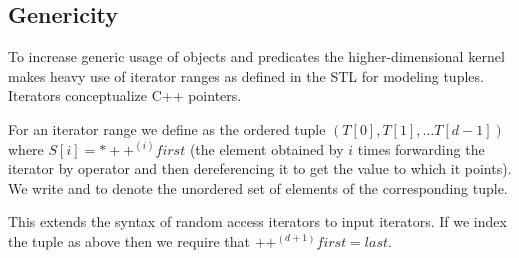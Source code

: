\subsection{Genericity}

To increase generic usage of objects and predicates the
higher-dimensional kernel makes heavy use of iterator ranges as
defined in the STL for modeling tuples. Iterators conceptualize C++
pointers. 

For an iterator range \ccc{[first,last)} we define \ccc{T = tuple
  [first,last)} as the ordered tuple $(T[0],T[1], \ldots T[d-1])$
where $S[i] = *++^{(i)}\mathit{first}$ (the element obtained by $i$
times forwarding the iterator by operator \ccc{++} and then
dereferencing it to get the value to which it points).  We write \ccc{d
  = size [first,last)} and \ccc{S = set [first,last)} to denote the
unordered set of elements of the corresponding tuple.

This extends the syntax of random access iterators to input iterators.
If we index the tuple as above then we require that
$++^{(d+1)}\mathit{first} = \mathit{last}$.

